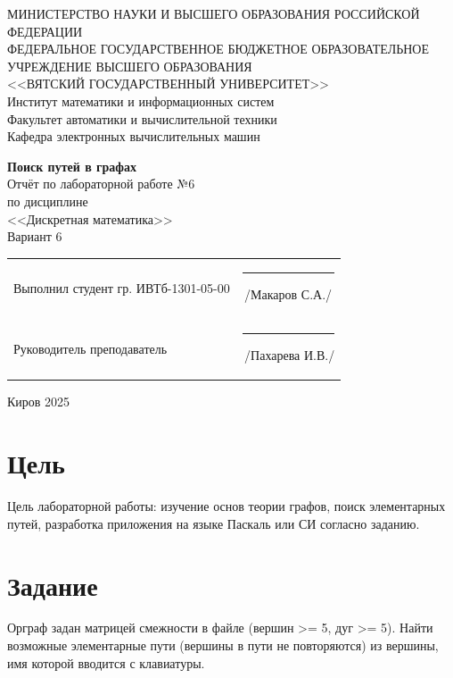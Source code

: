 \documentclass[a4paper,14pt]{extarticle}
\begin{document}
  \newpage\thispagestyle{empty}
  \begin{center}
    \MakeUppercase{
      Министерство науки и высшего образования Российской Федерации\\
      Федеральное государственное бюджетное образовательное учреждение высшего образования\\
      <<Вятский Государственный Университет>>\\
    }
    Институт математики и информационных систем\\
    Факультет автоматики и вычислительной техники\\
    Кафедра электронных вычислительных машин
  \end{center}
  \vfill

  \begin{center}
    \textbf{Поиск путей в графах}\\
    Отчёт по лабораторной работе №6\\
    по дисциплине\\
    <<Дискретная математика>>\\
    Вариант 6
  \end{center}
  \vfill

  \noindent
  \begin{tabular}{ll}
    Выполнил студент гр. ИВТб-1301-05-00 \hspace{5mm} &
    \rule[-1mm]{25mm}{0.10mm}\,/Макаров С.А./\\
    
    Руководитель преподаватель & \rule[-1mm]{25mm}{0.10mm}\,/Пахарева И.В./\\
  \end{tabular}

  \vfill
  \begin{center}
    Киров 2025
  \end{center}

  \newpage
  \section*{\hspace{12.5mm}Цель}
  Цель лабораторной работы: изучение основ теории графов, поиск элементарных путей, разработка приложения на языке Паскаль или СИ согласно заданию.

  \section*{\hspace{12.5mm}Задание}
  Орграф задан матрицей смежности в файле (вершин >= 5, дуг >= 5). Найти возможные элементарные пути (вершины в пути не повторяются) из вершины, имя которой вводится с клавиатуры.
\end{document}
